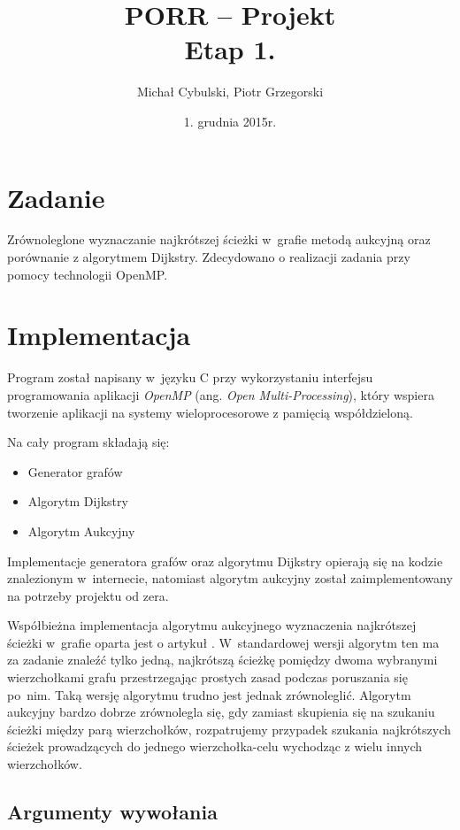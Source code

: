\documentclass {article}
\author {Michał Cybulski, Piotr Grzegorski}
\title {PORR -- Projekt\\Etap 1.}
\date {1. grudnia 2015r.}
\begin{document}
\maketitle

\section {Zadanie}

Zrównoleglone wyznaczanie najkrótszej ścieżki w~grafie metodą aukcyjną oraz porównanie z algorytmem Dijkstry. Zdecydowano o realizacji zadania przy pomocy technologii OpenMP.

\section{Implementacja}

Program został napisany w~języku C przy wykorzystaniu interfejsu programowania aplikacji \emph{OpenMP} (ang. \emph{Open Multi-Processing}), który wspiera tworzenie aplikacji na systemy wieloprocesorowe z pamięcią współdzieloną.

Na cały program składają się:
\begin{itemize}
    \item Generator grafów
    \item Algorytm Dijkstry
    \item Algorytm Aukcyjny
\end{itemize}

Implementacje generatora grafów oraz algorytmu Dijkstry opierają się na kodzie znalezionym w~internecie, natomiast algorytm aukcyjny został zaimplementowany na potrzeby projektu od zera. 

Współbieżna implementacja algorytmu aukcyjnego wyznaczenia najkrótszej ścieżki w~grafie oparta jest o artykuł \cite{Bertsekas1991}. W~standardowej wersji algorytm ten ma za zadanie znaleźć tylko jedną, najkrótszą ścieżkę pomiędzy dwoma wybranymi wierzchołkami grafu przestrzegając prostych zasad podczas poruszania się po~nim. Taką wersję algorytmu trudno jest jednak zrównoleglić. Algorytm aukcyjny bardzo dobrze zrównolegla się, gdy zamiast skupienia się na szukaniu ścieżki między parą wierzchołków, rozpatrujemy przypadek szukania najkrótszych ścieżek prowadzących do jednego wierzchołka-celu wychodząc z wielu innych wierzchołków.

\subsection{Argumenty wywołania}
\end{document}

